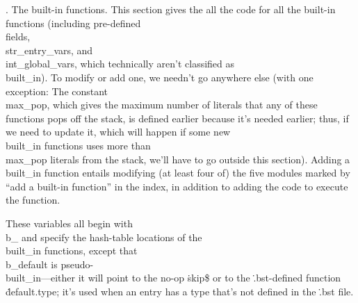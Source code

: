 .  The built-in functions.
This section gives the all the code for all the built-in functions
(including pre-defined \\{field}s, \\{str\_entry\_var}s, and
\\{int\_global\_var}s, which technically aren't classified as \\{built\_in}).
To modify or add one, we needn't go anywhere else (with one exception:
The constant \\{max\_pop}, which gives the maximum number of literals
that any of these functions pops off the stack, is defined earlier
because it's needed earlier; thus, if we need to update it, which will
happen if some new \\{built\_in} functions uses more than \\{max\_pop}
literals from the stack, we'll have to go outside this section).
Adding a \\{built\_in} function entails modifying (at least four of) the
five modules marked by ``add a built-in function'' in the index, in
addition to adding the code to execute the function.

These variables all begin with \\{b\_} and specify the hash-table
locations of the \\{built\_in} functions, except that \\{b\_default} is
pseudo-\\{built\_in}---either it will point to the no-op \.{skip\$} or to
the \.{.bst}-defined function \.{default.type}; it's used when an
entry has a type that's not defined in the \.{.bst} file.

